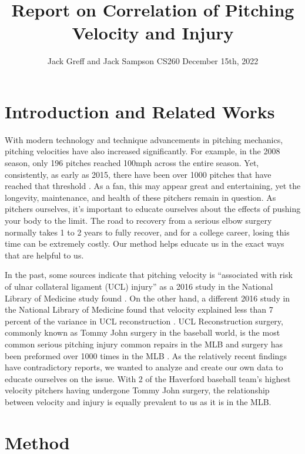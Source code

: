 \documentclass{article}
\title{Report on Correlation of Pitching Velocity and Injury}
\author{Jack Greff and Jack Sampson \AND CS260 \AND December 15th, 2022 }
\begin{document}
 \LARGE

\maketitle

\section{Introduction and Related Works}

With modern technology and technique advancements in pitching mechanics, pitching velocities have also increased significantly. For example, in the 2008 season, only 196 pitches reached 100mph across the entire season. Yet, consistently, as early as 2015, there have been over 1000 pitches that have reached that threshold \cite{Source3}. As a fan, this may appear great and entertaining, yet the longevity, maintenance, and health of these pitchers remain in question.  As pitchers ourselves, it’s important to educate ourselves about the effects of pushing your body to the limit. The road to recovery from a serious elbow surgery normally takes  1 to 2 years to fully recover, and for a college career, losing this time can be extremely costly. Our method helps educate us in the exact ways that are helpful to us. 

In the past, some sources indicate that pitching velocity is “associated with risk of ulnar collateral ligament (UCL) injury” as a 2016 study in the National Library of Medicine study found \cite{Source2}. On the other hand, a different 2016 study in the National Library of Medicine found that velocity explained less than 7 percent of the variance in UCL reconstruction \cite{Source4}. UCL Reconstruction surgery, commonly known as Tommy John surgery in the baseball world, is the most common serious pitching injury common repairs in the MLB and surgery has been preformed over 1000 times in the MLB \cite{Source1}.  As the relatively recent findings have contradictory reports, we wanted to analyze and create our own data to educate ourselves on the issue. With 2 of the Haverford baseball team’s highest velocity pitchers having undergone Tommy John surgery, the relationship between velocity and injury is equally prevalent to us as it is in the MLB. 

\raggedbottom 
\section{Method}
\end{document}
